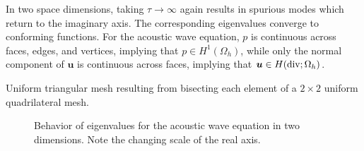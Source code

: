 \documentclass[10pt]{article}
\newcommand{\Oh}{\Omega_h}
\begin{document}
In two space dimensions, taking $\tau\rightarrow \infty$ again results in spurious modes which return to the imaginary axis.  The corresponding eigenvalues converge to conforming functions.  For the acoustic wave equation, $p$ is continuous across faces, edges, and vertices, implying that $p\in H^1(\Oh)$, while only the normal component of $\bm{u}$ is continuous across faces, implying that $\bm{u} \in H({\rm div}; \Oh)$.  

Uniform triangular mesh resulting from bisecting each element of a $2\times 2$ uniform quadrilateral mesh.  


\begin{figure}
\centering
{}
\hspace{.5em}
\hspace{.5em}
\caption{Behavior of eigenvalues for the acoustic wave equation in two dimensions. Note the changing scale of the real axis.}
\label{fig:waveeigs}
\end{figure}
\end{document}
